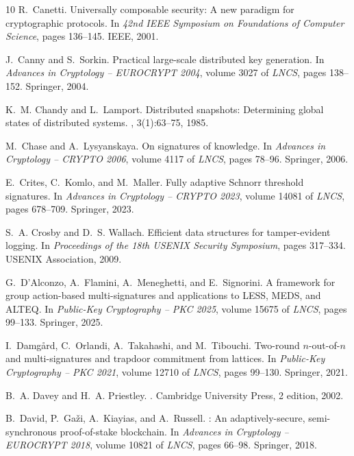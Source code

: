 \documentclass[11pt]{article}
\theoremstyle{definition}
\begin{document}
\begin{thebibliography}{10}
R.~Canetti.
\newblock Universally composable security: A new paradigm for cryptographic
  protocols.
\newblock In {\em 42nd IEEE Symposium on Foundations of Computer Science},
  pages 136--145. IEEE, 2001.

J.~Canny and S.~Sorkin.
\newblock Practical large-scale distributed key generation.
\newblock In {\em Advances in Cryptology -- EUROCRYPT 2004}, volume 3027 of
  {\em LNCS}, pages 138--152. Springer, 2004.

K.~M. Chandy and L.~Lamport.
\newblock Distributed snapshots: Determining global states of distributed
  systems.
, 3(1):63--75, 1985.

M.~Chase and A.~Lysyanskaya.
\newblock On signatures of knowledge.
\newblock In {\em Advances in Cryptology -- CRYPTO 2006}, volume 4117 of {\em
  LNCS}, pages 78--96. Springer, 2006.

E.~Crites, C.~Komlo, and M.~Maller.
\newblock Fully adaptive {Schnorr} threshold signatures.
\newblock In {\em Advances in Cryptology -- CRYPTO 2023}, volume 14081 of {\em
  LNCS}, pages 678--709. Springer, 2023.

S.~A. Crosby and D.~S. Wallach.
\newblock Efficient data structures for tamper-evident logging.
\newblock In {\em Proceedings of the 18th USENIX Security Symposium}, pages
  317--334. USENIX Association, 2009.

G.~D'Alconzo, A.~Flamini, A.~Meneghetti, and E.~Signorini.
\newblock A framework for group action-based multi-signatures and applications
  to {LESS}, {MEDS}, and {ALTEQ}.
\newblock In {\em Public-Key Cryptography -- PKC 2025}, volume 15675 of {\em
  LNCS}, pages 99--133. Springer, 2025.

I.~Damg{\aa}rd, C.~Orlandi, A.~Takahashi, and M.~Tibouchi.
\newblock Two-round $n$-out-of-$n$ and multi-signatures and trapdoor commitment
  from lattices.
\newblock In {\em Public-Key Cryptography -- PKC 2021}, volume 12710 of {\em
  LNCS}, pages 99--130. Springer, 2021.

B.~A. Davey and H.~A. Priestley.
.
\newblock Cambridge University Press, 2 edition, 2002.

B.~David, P.~Ga{\v{z}}i, A.~Kiayias, and A.~Russell.
: An adaptively-secure, semi-synchronous
  proof-of-stake blockchain.
\newblock In {\em Advances in Cryptology -- EUROCRYPT 2018}, volume 10821 of
  {\em LNCS}, pages 66--98. Springer, 2018.


\end{thebibliography}
\end{document}
